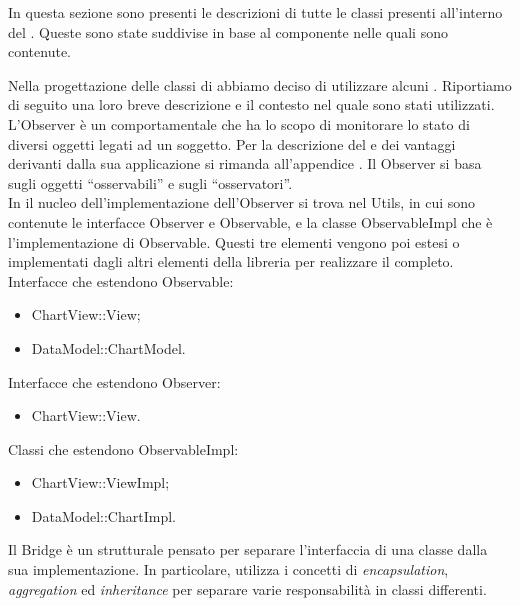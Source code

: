 	In questa sezione sono presenti le descrizioni di tutte le classi presenti all'interno del  . Queste sono state suddivise in base al componente nelle quali sono contenute.
	
	
	
		Nella progettazione delle classi di  abbiamo deciso di utilizzare alcuni . Riportiamo di seguito una loro breve descrizione e il contesto nel quale sono stati utilizzati.
			L'Observer è un  comportamentale che ha lo scopo di monitorare lo stato di diversi oggetti legati ad un soggetto.
			Per la descrizione del  e dei vantaggi derivanti dalla sua applicazione si rimanda all'appendice .
				Il  Observer si basa sugli oggetti “osservabili” e sugli “osservatori”. \\In {} il nucleo dell'implementazione dell'Observer si trova nel  Utils, in cui sono contenute le interfacce Observer e Observable, e la classe ObservableImpl che è l'implementazione di Observable. Questi tre elementi vengono poi estesi o implementati dagli altri elementi della libreria per realizzare il  completo.\\
				Interfacce che estendono Observable:
				\begin{itemize}
					\item ChartView::View;
					\item DataModel::ChartModel.
				\end{itemize}
				Interfacce che estendono Observer:
				\begin{itemize}
					\item ChartView::View.
				\end{itemize}
				Classi che estendono ObservableImpl:
				\begin{itemize}
					\item ChartView::ViewImpl;
					\item DataModel::ChartImpl.
				\end{itemize}
			Il Bridge è un  strutturale pensato per separare l'interfaccia di una classe dalla sua implementazione. In particolare, utilizza i concetti di \textit{encapsulation}, \textit{aggregation} ed \textit{inheritance} per separare varie responsabilità in classi differenti. \\
